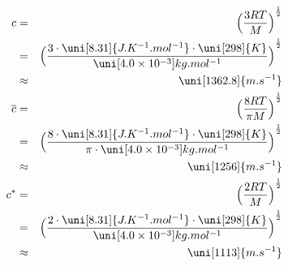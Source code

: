 \begin{eqnarray*}
c &=&
{
\Bigl(
\frac{3 RT}{M}
\Bigr) 
}^\frac{1}{2}
\\ &=&
{
\Bigl(
\frac{3 \cdot \uni[8.31]{J.K^{-1}.mol^{-1}}  \cdot
\uni[298]{K}}{\uni[4.0 \times 10^{-3}]{kg.mol^{-1}}}
\Bigr) 
}^\frac{1}{2} 
\\ &\approx &
\uni[1362.8]{m.s^{-1}}
\\
\overline{c} &=&
{
\Bigl(
\frac{8 RT}{\pi M}
\Bigr) 
}^\frac{1}{2}
\\ &=&
{
\Bigl(
\frac{8 \cdot \uni[8.31]{J.K^{-1}.mol^{-1}}  \cdot
\uni[298]{K}}{\pi \cdot \uni[4.0 \times 10^{-3}]{kg.mol^{-1}}}
\Bigr) 
}^\frac{1}{2} 
\\ &\approx &
\uni[1256]{m.s^{-1}}
\\
c^{\ast} &=&
{
\Bigl(
\frac{2 RT}{M}
\Bigr) 
}^\frac{1}{2}
\\ &=&
{
\Bigl(
\frac{2 \cdot \uni[8.31]{J.K^{-1}.mol^{-1}}  \cdot
\uni[298]{K}}{\uni[4.0 \times 10^{-3}]{kg.mol^{-1}}}
\Bigr) 
}^\frac{1}{2} 
\\ &\approx &
\uni[1113]{m.s^{-1}}
\label{}
\end{eqnarray*}
